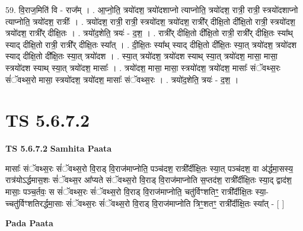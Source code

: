 \documentclass[17pt]{extarticle}
\begin{document}
59. वि॒राज॒मिति॑ वि - राज᳚म् । . आ॒प्नो॒ति॒ त्रयो॑दश॒ त्रयो॑दशाप्नो त्याप्नोति॒ त्रयो॑दश॒ रात्री॒ रात्री॒ स्त्रयो॑दशाप्नो त्याप्नोति॒ त्रयो॑दश॒ रात्रीः᳚ । . त्रयो॑दश॒ रात्री॒ रात्री॒ स्त्रयो॑दश॒ त्रयो॑दश॒ रात्री᳚र् दीक्षि॒तो दी᳚क्षि॒तो रात्री॒ स्त्रयो॑दश॒ त्रयो॑दश॒ रात्री᳚र् दीक्षि॒तः । . त्रयो॑द॒शेति॒ त्रयः॑ - द॒श॒ । . रात्री᳚र् दीक्षि॒तो दी᳚क्षि॒तो रात्री॒ रात्री᳚र् दीक्षि॒तः स्या᳚थ् स्याद् दीक्षि॒तो रात्री॒ रात्री᳚र् दीक्षि॒तः स्या᳚त् । . दी॒क्षि॒तः स्या᳚थ् स्याद् दीक्षि॒तो दी᳚क्षि॒तः स्या॒त् त्रयो॑दश॒ त्रयो॑दश स्याद् दीक्षि॒तो दी᳚क्षि॒तः स्या॒त् त्रयो॑दश । . स्या॒त् त्रयो॑दश॒ त्रयो॑दश स्याथ् स्या॒त् त्रयो॑दश॒ मासा॒ मासा॒ स्त्रयो॑दश स्याथ् स्या॒त् त्रयो॑दश॒ मासाः᳚ । . त्रयो॑दश॒ मासा॒ मासा॒ स्त्रयो॑दश॒ त्रयो॑दश॒ मासाः᳚ संॅवथ्स॒रः सं॑ॅवथ्स॒रो मासा॒ स्त्रयो॑दश॒ त्रयो॑दश॒ मासाः᳚ संॅवथ्स॒रः । . त्रयो॑द॒शेति॒ त्रयः॑ - द॒श॒ । \newline
\pagebreak
{}

\section{ TS 5.6.7.2 }

\textbf{TS 5.6.7.2 } \newline
\textbf{Samhita Paata} \newline

मासाः᳚ संॅवथ्स॒रः सं॑ॅवथ्स॒रो वि॒राड् वि॒राज॑माप्नोति॒ पञ्च॑दश॒ रात्री᳚र्दीक्षि॒तः स्या॒त् पञ्च॑दश॒ वा अ॑र्द्धमा॒सस्य॒ रात्र॑योऽर्द्धमास॒शः सं॑ॅवथ्स॒र आ᳚प्यते संॅवथ्स॒रो वि॒राड् वि॒राज॑माप्नोति स॒प्तद॑श॒ रात्री᳚र्दीक्षि॒तः स्या॒द् द्वाद॑श॒ मासाः॒ पञ्च॒र्तवः॒ स सं॑ॅवथ्स॒रः सं॑ॅवथ्स॒रो वि॒राड् वि॒राज॑माप्नोति॒ चतु॑र्विꣳशतिꣳ॒॒ रात्री᳚र्दीक्षि॒तः स्या॒-च्चतु॑र्विꣳशतिरर्द्धमा॒साः सं॑ॅवथ्स॒रः सं॑ॅवथ्स॒रो वि॒राड् वि॒राज॑माप्नोति त्रिꣳ॒॒शतꣳ॒॒ रात्री᳚र्दीक्षि॒तः स्या᳚त् - [  ] \newline

\textbf{Pada Paata} \newline
\end{document}

